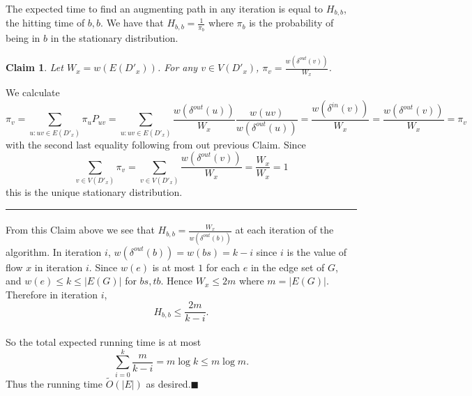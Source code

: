 \documentclass[letterpaper,12pt,oneside,onecolumn]{article}
\newenvironment{proof}{{\bf Proof:  }}{\hfill\rule{2mm}{2mm}}
\newtheorem{claim}[fact]{Claim}
\begin{document}
\paragraph{}
The expected time to find an augmenting path in any iteration is equal to $H_{b,b}$, the hitting time of $b,b$. We have that $H_{b,b} = \frac{1}{\pi_b}$ where $\pi_b$ is the probability of being in $b$ in the stationary distribution.
\begin{claim}
	Let $W_x = w(E(D'_x))$. For any $v \in V(D'_x)$, $\pi_v = \frac{w(\delta^{out}(v))}{W_x}$.
\end{claim}
\begin{proof}
	We calculate
	$$\pi_v = \sum_{u: uv \in E(D'_x)} \pi_uP_{uv} = \sum_{u:uv \in E(D'_x)} \frac{w(\delta^{out}(u))}{W_x}\frac{w(uv)}{w(\delta^{out}(u))} = \frac{w(\delta^{in}(v))}{W_x} = \frac{w(\delta^{out}(v))}{W_x} = \pi_v$$
	with the second last equality following from out previous Claim. Since 
	$$\sum_{v \in V(D'_x)} \pi_v = \sum_{v\in V(D'_x)} \frac{w(\delta^{out}(v))}{W_x} = \frac{W_x}{W_x} = 1$$
	this is the unique stationary distribution.
\end{proof}
\paragraph{}
From this Claim above we see that $H_{b,b} = \frac{W_x}{w(\delta^{out}(b))}$ at each iteration of the algorithm.
In iteration $i$, $w(\delta^{out}(b)) = w(bs) = k-i$ since $i$ is the value of flow $x$ in iteration $i$. Since $w(e)$ is at most $1$ for each $e$ in the edge set of $G$, and $w(e) \leq k\leq |E(G)|$ for $bs, tb$. Hence $W_x \leq 2m$ where $m = |E(G)|$. Therefore in iteration $i$,
$$H_{b,b} \leq \frac{2m}{k-i}.$$
\paragraph{}
So the total expected running time is at most
$$\sum_{i=0}^k\frac{m}{k-i} = m\log k \leq m\log m.$$
Thus the running time $\tilde{O}(|E|)$ as desired.$\blacksquare$
\newpage
\section{}
\end{document}
